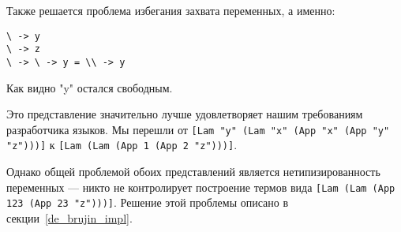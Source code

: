 Также решается проблема избегания захвата переменных, а именно:
\begin{lstlisting}
\ -> y
\ -> z
\ -> \ -> y = \\ -> y
\end{lstlisting}

Как видно "y" остался свободным.

Это представление значительно лучше удовлетворяет нашим требованиям разработчика языков. Мы перешли от
\lstinline{[Lam "y" (Lam "x" (App "x" (App "y" "z")))]} к \lstinline{[Lam (Lam (App 1 (App 2 "z")))]}.

Однако общей проблемой обоих представлений является нетипизированность переменных --- никто не контролирует построение термов вида \lstinline{[Lam (Lam (App 123 (App 23 "z")))]}. Решение этой проблемы описано в секции~\ref{de_brujin_impl}.









